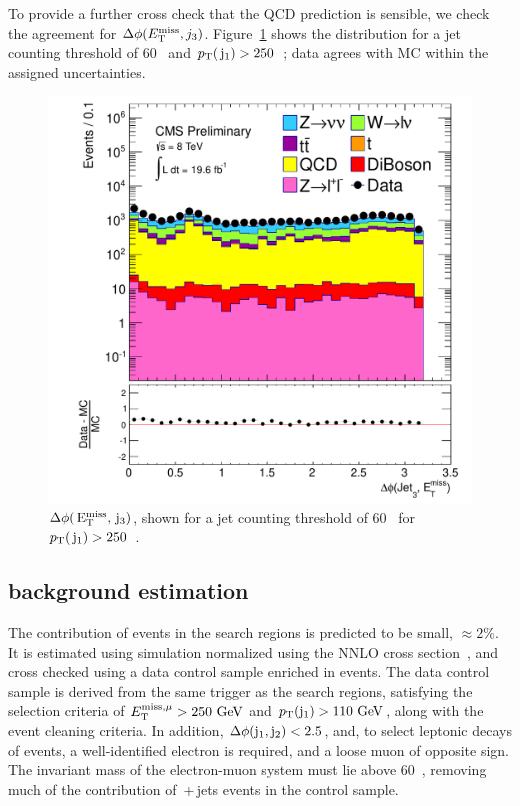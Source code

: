 To provide a further cross check that the QCD prediction is sensible, we check the agreement for  $\Delta \phi (E_{\text{T}}^{\text{miss}}, j_{3})$. 
Figure~\ref{dphi_METj3} shows the distribution for a jet counting threshold of 60~\GeV{} and $p_{\text{T}}(\,\mathrm{j}_1)>250$~\GeV; data agrees with MC within the assigned uncertainties.

\begin{figure}[htbp!]
\begin{center}
 \includegraphics[scale=0.4]{Figures/sus13009/dPhi_MetLep_Jet3.pdf}
 \caption{ $\Delta \phi(\,\mathrm{E_{\text{T}}^{\text{miss}}}, \,\mathrm{j}_3)$, shown for a jet counting threshold of 60~\GeV{} for $p_{\text{T}}(\,\mathrm{j}_1)>250$~\GeV.}
 \label{dphi_METj3}
 \end{center}
 \end{figure}


\subsection{\ttbar background estimation}
\label{sec:ttbar}
The contribution of \ttbar events in the search regions is predicted to be small, $\approx2\%$.
It is estimated using simulation normalized using the \ac{NNLO} cross section~\cite{ttbarxs}, 
and cross checked using a data control sample enriched in \ttbar events. 
The data control sample is derived from the same trigger as the search regions, satisfying the selection criteria of $E^{\rm miss, \mu}_{\rm T}>250~\mathrm{GeV}$ and $p_{\text{T}}({\rm j}_1)>110~\mathrm{GeV}$, along with the event cleaning criteria. 
In addition, $\Delta \phi({\rm j}_1, {\rm j}_2)<2.5$, and, to select leptonic decays of \ttbar events, 
a well-identified electron is required, and a loose muon of opposite sign. 
The invariant mass of the electron-muon system must lie above 60~\GeV, removing much of the contribution of \zellellbr{}\,+\,jets events in the control sample. 

